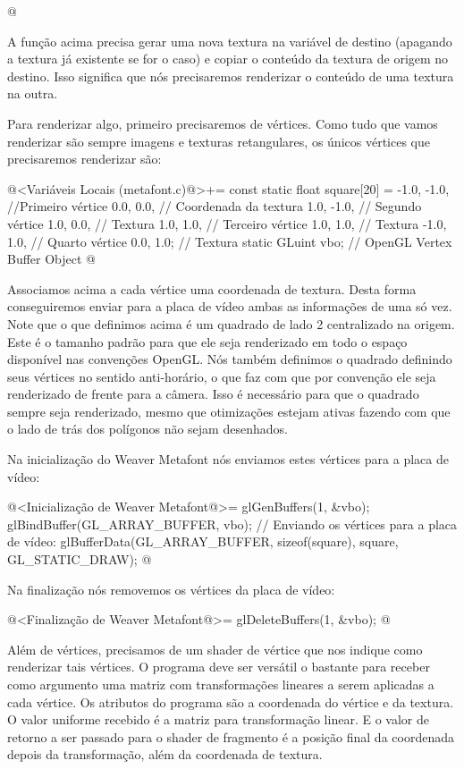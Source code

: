 {{}
@
\fimcodigo

A função  acima precisa gerar
uma nova textura na variável de destino (apagando a textura já
existente se for o caso) e copiar o conteúdo da textura de origem no
destino. Isso significa que nós precisaremos renderizar o conteúdo de
uma textura na outra.

Para renderizar algo, primeiro precisaremos de vértices. Como tudo que
vamos renderizar são sempre imagens e texturas retangulares, os únicos
vértices que precisaremos renderizar são:

\iniciocodigo
@<Variáveis Locais (metafont.c)@>+=
const static float square[20] = {
  -1.0, -1.0, //Primeiro vértice
  0.0, 0.0, // Coordenada da textura
  1.0, -1.0, // Segundo vértice
  1.0, 0.0, // Textura
  1.0, 1.0, // Terceiro vértice
  1.0, 1.0, // Textura
  -1.0, 1.0, // Quarto vértice
  0.0, 1.0}; // Textura
static GLuint vbo; // OpenGL Vertex Buffer Object
@
\fimcodigo

Associamos acima a cada vértice uma coordenada de textura. Desta forma
conseguiremos enviar para a placa de vídeo ambas as informações de uma
só vez. Note que o que definimos acima é um quadrado de lado 2
centralizado na origem. Este é o tamanho padrão para que ele seja
renderizado em todo o espaço disponível nas convenções OpenGL. Nós
também definimos o quadrado definindo seus vértices no sentido
anti-horário, o que faz com que por convenção ele seja renderizado de
frente para a câmera. Isso é necessário para que o quadrado sempre
seja renderizado, mesmo que otimizações estejam ativas fazendo com que
o lado de trás dos polígonos não sejam desenhados.

Na inicialização do Weaver Metafont nós enviamos estes vértices para
a placa de vídeo:

\iniciocodigo
@<Inicialização de Weaver Metafont@>=
glGenBuffers(1, &vbo);
glBindBuffer(GL_ARRAY_BUFFER, vbo);
// Enviando os vértices para a placa de vídeo:
glBufferData(GL_ARRAY_BUFFER, sizeof(square), square, GL_STATIC_DRAW);
@
\fimcodigo

Na finalização nós removemos os vértices da placa de vídeo:

\iniciocodigo
@<Finalização de Weaver Metafont@>=
glDeleteBuffers(1, &vbo);
@
\fimcodigo

Além de vértices, precisamos de um shader de vértice que nos indique
como renderizar tais vértices. O programa deve ser versátil o bastante
para receber como argumento uma matriz com transformações lineares a
serem aplicadas a cada vértice. Os atributos do programa são a
coordenada do vértice e da textura. O valor uniforme recebido é a
matriz para transformação linear. E o valor de retorno a ser passado para o shader de
fragmento é a posição final da coordenada depois da transformação,
além da coordenada de textura. 

}
